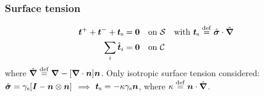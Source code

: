 \documentclass[11pt]{beamer} %
\newcommand{\surf}{\mathrm{s}}
\begin{document}
\begin{frame}
 \frametitle{Surface tension}
    \begin{center}
    
    \end{center}
\begin{align}
    \ta{t}^+ + \ta{t}^- + \ta{t}_\surf &= \ta{0} \quad \text{on} \,\, \mathcal{S} \quad \text{with } \ta{t}_\surf \defeq \hat{\ts\sigma}\cdot\hat{\diff}
\label{eq103KR}\\
    \sum_i \hat{\ta t}_i &= \ta{0} \quad \text{on} \,\, \mathcal{C}
\label{eq104KR}
\end{align}
where $\hat{\boldsymbol{\nabla}} \overset{\mathrm{def}}{=} \boldsymbol{\nabla} - [\boldsymbol{\nabla}\cdot\boldsymbol{n}]\boldsymbol{n}$.
Only isotropic surface tension considered: $\hat{\ts\sigma} = \gamma_\surf[\ts I-\ta n\outerp\ts n]$ $\implies$
$ \ta t_\surf = -\kappa \gamma_\surf \ta n$, where $\kappa \overset{\mathrm{def}}{=} \boldsymbol{n} \cdot\hat{\boldsymbol{\nabla}}$.
\end{frame}
\end{document}
